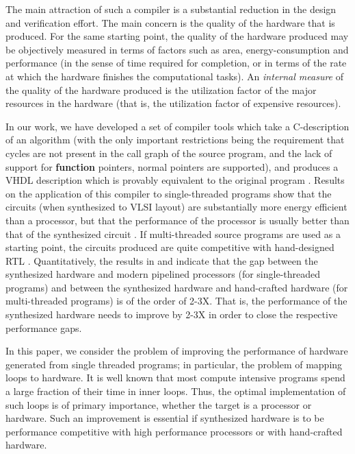 \documentclass[conference]{IEEEtran}
\begin{document}
The main attraction of such a compiler is a substantial reduction in 
the design and verification effort.  The
main concern is the quality of the hardware that is produced.
For the same starting point, the quality of the hardware produced may be objectively
measured in terms of factors such as area, energy-consumption and performance (in the
sense of time required for completion, or in terms of the rate at which the hardware
finishes the computational tasks).  An {\em internal measure} of the quality of the
hardware produced is the utilization factor of the major resources in the hardware (that is,
the utilization factor of expensive resources).  

In our work, we have developed a set of compiler tools which take a C-description of
an algorithm (with the only important restrictions being the requirement that
cycles are not present in the call graph of the source program, and the lack of 
support for {\bf function} pointers, normal pointers are supported), and produces
a VHDL description which is provably equivalent to the original program \cite{SameerPhD}.
Results on the application of this compiler to single-threaded programs show
that the circuits (when synthesized to VLSI layout) are substantially more
energy efficient than a processor, but that the performance of the processor
is usually better than that of the synthesized circuit \cite{ahirDsd2010}.
If multi-threaded source programs are used as a starting point, the circuits produced 
are quite competitive with hand-designed RTL \cite{ahirUsenix2012}.
Quantitatively, the results in \cite{ahirDsd2010} and \cite{ahirUsenix2012} indicate
that the gap between the synthesized hardware and modern
pipelined processors (for single-threaded
programs) and between the synthesized hardware and hand-crafted hardware (for
multi-threaded programs) is of the order of 2-3X.  That is, the performance
of the synthesized hardware needs to improve by 2-3X in order to close
the respective performance gaps.

In this paper, we consider the problem of improving the performance
of hardware generated from single threaded programs; in
particular, the problem of mapping loops to hardware.  It
is well known that most compute intensive programs spend a large fraction
of their time in inner loops.  Thus, the optimal implementation
of such loops is of primary importance, whether the target is
a processor or hardware.  Such an improvement is essential if
synthesized hardware is to be performance competitive with
high performance processors or with hand-crafted hardware.
\end{document}
